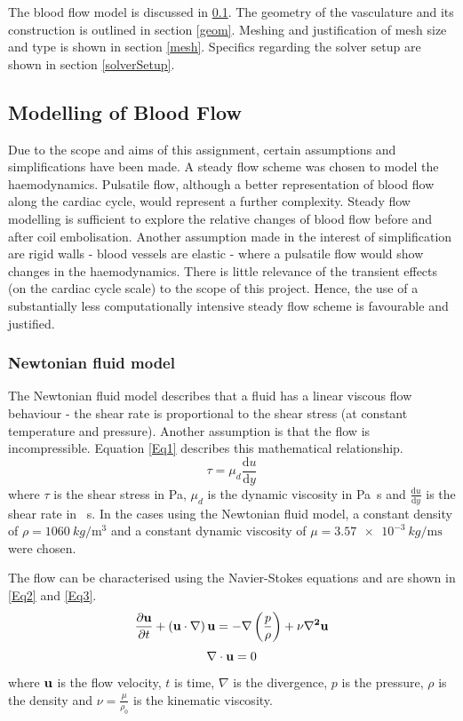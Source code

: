 \documentclass[journal,twoside,web]{ieeecolor}
\begin{document}
The blood flow model is discussed in \ref{flows}. The geometry of the vasculature and its construction is outlined in section \ref{geom}. Meshing and justification of mesh size and type is shown in section \ref{mesh}. Specifics regarding the solver setup are shown in section \ref{solverSetup}.
\subsection{Modelling of Blood Flow}\label{flows}
Due to the scope and aims of this assignment, certain assumptions and simplifications have been made. A steady flow scheme was chosen to model the haemodynamics. Pulsatile flow, although a better representation of blood flow along the cardiac cycle, would represent a further complexity. Steady flow modelling is sufficient to explore the relative changes of blood flow before and after coil embolisation. Another assumption made in the interest of simplification are rigid walls - blood vessels are elastic - where a pulsatile flow would show changes in the haemodynamics. There is little relevance of the transient effects (on the cardiac cycle scale) to the scope of this project. Hence, the use of a substantially less computationally intensive steady flow scheme is favourable and justified.
\subsubsection{Newtonian fluid model}
The Newtonian fluid model describes that a fluid has a linear viscous flow behaviour - the shear rate is proportional to the shear stress (at constant temperature and pressure). Another assumption is that the flow is incompressible. Equation \eqref{Eq1} describes this mathematical relationship.
\begin{equation}\label{Eq1}
    \tau = \mu_d \frac{\textrm{d}u}{\textrm{d}y}
\end{equation}
where $\tau$ is the shear stress in \si{\pascal}, $\mu_d$ is the dynamic viscosity in \si{\pascal\second} and $\frac{\textrm{d}u}{\textrm{d}y}$ is the shear rate in \si{\per\second}. In the cases using the Newtonian fluid model, a constant density of $\rho = \SI{1060}{kg\per\meter\cubed}$ and a constant dynamic viscosity of $\mu = \SI{3.57e-3}{kg\per\meter\second}$ were chosen.

The flow can be characterised using the Navier-Stokes equations and are shown in \eqref{Eq2} and \eqref{Eq3}.
\begin{equation}\label{Eq2}
    \frac{\partial \vb{u}}{\partial t} + \left(\vb{u\cdot \nabla}\right)\vb{u} = - \vb{\nabla}\left(\frac{p}{\rho}\right) + \nu \vb{\nabla^2 u}
\end{equation}
\begin{equation}\label{Eq3}
    \nabla \cdot \vb{u} = 0
\end{equation}
where $\vb{u}$ is the flow velocity, $t$ is time, $\nabla$ is the divergence, $p$ is the pressure, $\rho$ is the density and $\nu = \frac{\mu}{\rho_0}$ is the kinematic viscosity.
\end{document}
